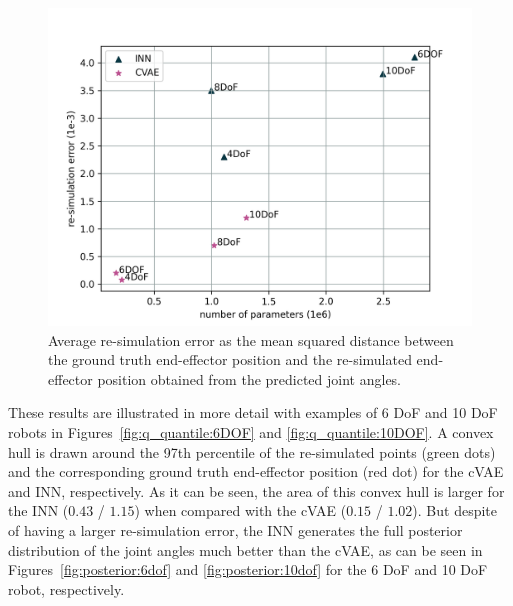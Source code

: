 \documentclass[conference]{IEEEtran}
\begin{document}
\begin{figure}[ht]
\centering
	\includegraphics[width=\linewidth]{figures/comparison_e_resim_alternative.png}
    \caption{\label{fig:plot:resim} Average re-simulation error as the mean squared distance between the ground truth end-effector position and the re-simulated end-effector position obtained from the predicted joint angles.}
\end{figure}

These results are illustrated in more detail with examples of 6 DoF and 10 DoF robots in Figures~\ref{fig:q_quantile:6DOF} and \ref{fig:q_quantile:10DOF}. A convex hull is drawn around the 97th percentile of the re-simulated points (green dots) and the corresponding ground truth end-effector position (red dot) for the cVAE and INN, respectively.  As it can be seen, the area of this convex hull is larger for the INN ($0.43$ / $1.15$) when compared with the cVAE ($0.15$ / $1.02$). But despite of having a larger re-simulation error, the INN generates the full posterior distribution of the joint angles much better than the cVAE, as can be seen in Figures~\ref{fig:posterior:6dof} and \ref{fig:posterior:10dof} for the 6 DoF and 10 DoF robot, respectively. 
\end{document}
